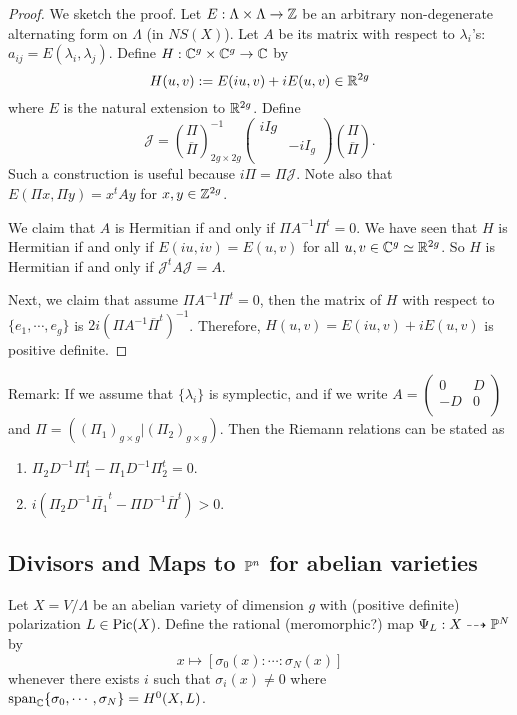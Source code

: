 \begin{proof}
We sketch the proof. Let $E:\Lambda\times \Lambda \to {\mathbb Z}$ be an arbitrary non-degenerate alternating form on $\Lambda$ (in $NS(X)$). Let $A$ be its matrix with respect to $\lambda_i$'s: $a_{ij}=E(\lambda_i,\lambda_j)$. Define $H:{\mathbb C}^g\times {\mathbb C}^g\to {\mathbb C}$ by 
\[
H(u,v):=E(iu,v)+iE(u,v) \in {\mathbb R}^{2g}
\]
where $E$ is the natural extension to ${\mathbb R}^{2g}$. Define 
\[
\mathcal{J}=\binom{\Pi}{\overline{\Pi}}^{-1}_{2g\times 2g} \left(
\begin{array}{cc}
iIg & \ \\
\ & -i I_g\\
\end{array}
\right)\binom{\Pi}{\overline{\Pi}}.
\]
Such a construction is useful because $i\Pi = \Pi \mathcal{J}$. Note also that $E(\Pi x,\Pi y)=x^t A y$ for $x,y\in {\mathbb Z}^{2g}$. 

We claim that $A$ is Hermitian if and only if $\Pi A^{-1} \Pi^t=0$. We have seen that $H$ is Hermitian if and only if $E(iu,iv)=E(u,v)$ for all $u,v\in {\mathbb C}^{g}\simeq {\mathbb R}^{2g}$. So $H$ is Hermitian if and only if $\mathcal{J}^t A \mathcal{J}=A$.

Next, we claim that assume $\Pi A^{-1} \Pi^t=0$, then the matrix of $H$ with respect to $\{e_1,\cdots,e_g\}$ is $2i(\Pi A^{-1} \overline{\Pi}^t)^{-1}$. Therefore, $H(u,v)=E(iu,v)+i E(u,v)$ is positive definite.
\end{proof}

Remark: If we assume that $\{\lambda_i\}$ is symplectic, and if we write $A=\left(
\begin{array}{cc}
0 & D\\
-D & 0 \\
\end{array}
\right)$
and $\Pi = ((\Pi_1)_{g\times g} | (\Pi_2)_{g\times g})$. Then the Riemann relations can be stated as 
\begin{enumerate}
\item $\Pi_2 D^{-1} \Pi_1^t-\Pi_1 D^{-1}\Pi_2^t=0$.
\item $i(\Pi_2 D^{-1}\overline{\Pi_1}^t-\Pi D^{-1}\overline{\Pi}^t)>0$. 
\end{enumerate}

\subsection{Divisors and Maps to ${\mathbb P}^n$ for abelian varieties}
Let $X=V/\Lambda$ be an abelian variety of dimension $g$ with (positive definite) polarization $L\in \operatorname{Pic}(X)$. Define the rational (meromorphic?) map $\Psi_L: X\dashrightarrow {\mathbb P}^N$ by
$$x\mapsto [\sigma_0(x):\cdots:\sigma_N(x)]$$
whenever there exists $i$ such that $\sigma_i(x)\not= 0$ where $\text{span}_{\mathbb C}\{\sigma_0,\cdots,\sigma_N\}=H^0(X,L)$. 

